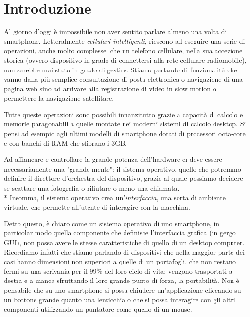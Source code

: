 \clearpage{\pagestyle{empty}\cleardoublepage}
\chapter{Introduzione}\label{ch:introduzione}

Al giorno d’oggi è impossibile non aver sentito parlare almeno una volta di smartphone. Letteralmente \emph{cellulari intelligenti},  
riescono ad eseguire una serie di operazioni, anche molto complesse, che un telefono cellulare, nella sua accezione storica (ovvero dispositivo in grado di connettersi alla rete cellulare radiomobile), non sarebbe mai stato in grado di gestire. Stiamo parlando di funzionalità che vanno dalla più semplice consultazione di posta elettronica o navigazione di una pagina web sino ad arrivare alla registrazione di video in slow motion o permettere la navigazione satellitare.

Tutte queste operazioni sono possibili innanzitutto grazie a capacità di calcolo e memorie paragonabili a quelle montate nei moderni sistemi di calcolo desktop. Si pensi ad esempio agli ultimi modelli di smartphone dotati di processori octa-core e con banchi di RAM che sfiorano i 3GB.

Ad affiancare e controllare la grande potenza dell’hardware ci deve essere necessariamente una "grande mente": il sistema operativo, quello che potremmo definire il direttore d’orchestra del dispositivo, grazie al quale possiamo decidere se scattare una fotografia o rifiutare o meno una chiamata. \\*
Insomma, il sistema operativo crea un’\emph{interfaccia}, una sorta di ambiente virtuale, che permette all’utente di interagire con la macchina. 

Detto questo, è chiaro come un sistema operativo di uno smartphone, in particolar modo quella componente che definisce l’interfaccia grafica (in gergo GUI), non possa avere le stesse caratteristiche di quello di un desktop computer.
Ricordiamo infatti che stiamo parlando di dispositivi che nella maggior parte dei casi hanno dimensioni non superiori a quelle di un portafogli, che non restano fermi su una scrivania per il 99\% del loro ciclo di vita: vengono trasportati a destra e a manca sfruttando il loro grande punto di forza, la portabilità. 
Non è pensabile che su uno smartphone si possa chiudere un’applicazione cliccando su un bottone grande quanto una lenticchia o che si possa interagire con gli altri componenti utilizzando un puntatore come quello di un mouse.

